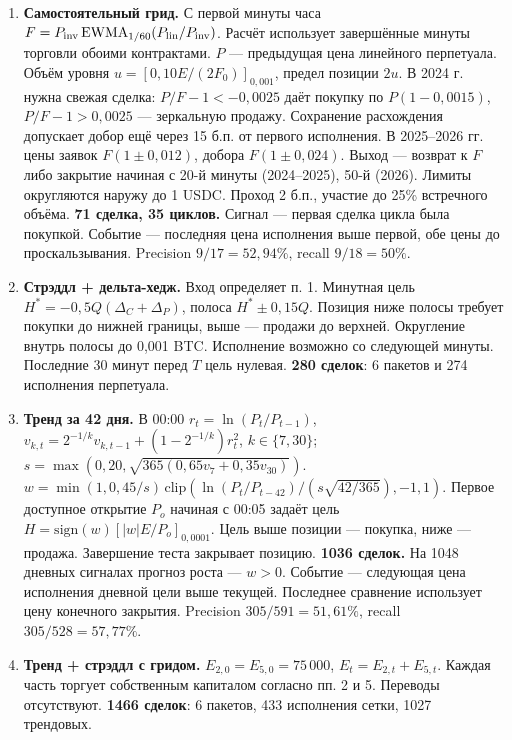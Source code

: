 \begin{enumerate}
\item \textbf{Самостоятельный грид.} С первой минуты часа $F=P_{\rm inv}\,\mathrm{EWMA}_{1/60}(P_{\rm lin}/P_{\rm inv})$. Расчёт использует завершённые минуты торговли обоими контрактами. $P$ --- предыдущая цена линейного перпетуала. Объём уровня $u=[0{,}10E/(2F_0)]_{0{,}001}$, предел позиции $2u$. В 2024 г. нужна свежая сделка: $P/F-1<-0{,}0025$ даёт покупку по $P(1-0{,}0015)$, $P/F-1>0{,}0025$ --- зеркальную продажу. Сохранение расхождения допускает добор ещё через 15 б.п. от первого исполнения. В 2025--2026 гг. цены заявок $F(1\pm0{,}012)$, добора $F(1\pm0{,}024)$. Выход --- возврат к $F$ либо закрытие начиная с 20-й минуты (2024--2025), 50-й (2026). Лимиты округляются наружу до 1 USDC. Проход 2 б.п., участие до 25\% встречного объёма. \textbf{71 сделка, 35 циклов.} Сигнал --- первая сделка цикла была покупкой. Событие --- последняя цена исполнения выше первой, обе цены до проскальзывания. Precision $9/17=52{,}94\%$, recall $9/18=50\%$.
\item \textbf{Стрэддл + дельта-хедж.} Вход определяет п. 1. Минутная цель $H^*=-0{,}5Q(\Delta_C+\Delta_P)$, полоса $H^*\pm0{,}15Q$. Позиция ниже полосы требует покупки до нижней границы, выше --- продажи до верхней. Округление внутрь полосы до 0,001 BTC. Исполнение возможно со следующей минуты. Последние 30 минут перед $T$ цель нулевая. \textbf{280 сделок}: 6 пакетов и 274 исполнения перпетуала.
\item \textbf{Тренд за 42 дня.} В 00:00 $r_t=\ln(P_t/P_{t-1})$, $v_{k,t}=2^{-1/k}v_{k,t-1}+(1-2^{-1/k})r_t^2$, $k\in\{7,30\}$; $s=\max(0{,}20,\sqrt{365(0{,}65v_7+0{,}35v_{30})})$.
$w=\min(1,0{,}45/s)\,\mathrm{clip}(\ln(P_t/P_{t-42})/(s\sqrt{42/365}),-1,1)$.
Первое доступное открытие $P_o$ начиная с 00:05 задаёт цель $H=\mathrm{sign}(w)[|w|E/P_o]_{0{,}0001}$. Цель выше позиции --- покупка, ниже --- продажа. Завершение теста закрывает позицию. \textbf{1036 сделок.} На 1048 дневных сигналах прогноз роста --- $w>0$. Событие --- следующая цена исполнения дневной цели выше текущей. Последнее сравнение использует цену конечного закрытия. Precision $305/591=51{,}61\%$, recall $305/528=57{,}77\%$.
\item \textbf{Тренд + стрэддл с гридом.} $E_{2,0}=E_{5,0}=75\,000$, $E_t=E_{2,t}+E_{5,t}$. Каждая часть торгует собственным капиталом согласно пп. 2 и 5. Переводы отсутствуют. \textbf{1466 сделок}: 6 пакетов, 433 исполнения сетки, 1027 трендовых.
\end{enumerate}
